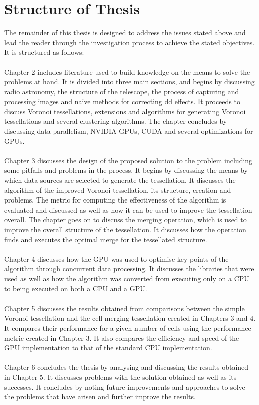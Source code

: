 \section{Structure of Thesis}
The remainder of this thesis is designed to address the issues stated above and lead the reader through the investigation process to achieve the stated objectives. It is structured as follows:
\\
\\
Chapter 2 includes literature used to build knowledge on the means to solve the problems at hand. It is divided into three main sections, and begins by discussing radio astronomy, the structure of the telescope, the process of capturing and processing images and naive methods for correcting \gls{dd} effects. It proceeds to discuss Voronoi tessellations, extensions and algorithms for generating Voronoi tessellations and several clustering algorithms. The chapter concludes by discussing data parallelism, NVIDIA GPUs, CUDA and several optimizations for GPUs.
\\
\\
Chapter 3 discusses the design of the proposed solution to the problem including some pitfalls and problems in the process. It begins by discussing the means by which data sources are selected to generate the tessellation. It discusses the algorithm of the improved Voronoi tessellation, its structure, creation and problems. The metric for computing the effectiveness of the algorithm is evaluated and discussed as well as how it can be used to improve the tessellation overall. The chapter goes on to discuss the merging operation, which is used to improve the overall structure of the tessellation. It discusses how the operation finds and executes the optimal merge for the tessellated structure.
\\
\\
Chapter 4 discusses how the GPU was used to optimise key points of the algorithm through concurrent data processing. It discusses the libraries that were used as well as how the algorithm was converted from executing only on a CPU to being executed on both a CPU and a GPU.
\\
\\
Chapter 5 discusses the results obtained from comparisons between the simple Voronoi tessellation and the cell merging tessellation created in Chapters 3 and 4. It compares their performance for a given number of cells using the performance metric created in Chapter 3. It also compares the efficiency and speed of the GPU implementation to that of the standard CPU implementation.
\\
\\
Chapter 6 concludes the thesis by analysing and discussing the results obtained in Chapter 5. It discusses problems with the solution obtained as well as its successes. It concludes by noting future improvements and approaches to solve the problems that have arisen and further improve the results.
